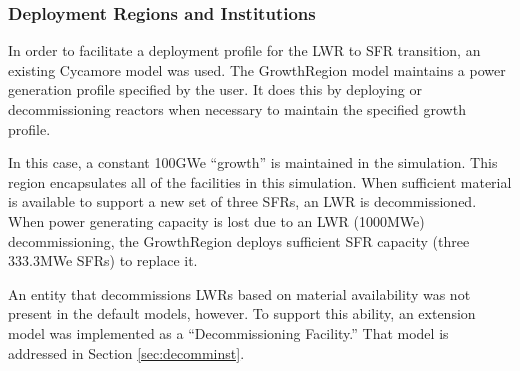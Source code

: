 \subsubsection{Deployment Regions and Institutions}

In order to facilitate a deployment profile for the LWR to SFR transition, an 
existing Cycamore model was used. The GrowthRegion model maintains a 
power generation profile specified by the user. It does this by deploying or 
decommissioning reactors when necessary to maintain the specified growth 
profile.  

In this case, a constant 100GWe ``growth'' is maintained in the simulation. 
This region encapsulates all of the facilities in this simulation. 
When sufficient material is available to support a new set of three SFRs, an 
LWR is decommissioned. When power generating capacity is lost due to an LWR 
(1000MWe) decommissioning, the GrowthRegion deploys sufficient SFR capacity 
(three 333.3MWe SFRs) to replace it. 

An entity that decommissions LWRs based on material availability was not 
present in the default models, however. To support this ability, an extension 
model was implemented as a ``Decommissioning Facility.'' That model is 
addressed in Section \ref{sec:decomminst}.


\FloatBarrier
